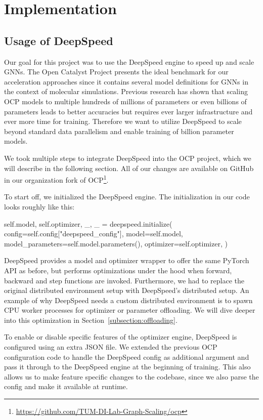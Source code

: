 \section{Implementation}
\label{section:implementation}

\subsection{Usage of DeepSpeed}

Our goal for this project was to use the DeepSpeed engine to speed up and scale 
GNNs. The Open Catalyst Project presents the ideal 
benchmark for our acceleration approaches since it contains several model definitions 
for GNNs in the context of molecular simulations. Previous research has shown 
that scaling OCP models to multiple hundreds of millions of parameters or even 
billions of parameters leads to better accuracies but requires ever larger infrastructure
and ever more time for training. Therefore we want to utilize 
DeepSpeed to scale beyond standard data parallelism and enable training of billion 
parameter models.

We took multiple steps to integrate DeepSpeed into the OCP project, which we will 
describe in the following section. All of our changes are available on GitHub in our 
organization fork of OCP\footnote{\url{https://github.com/TUM-DI-Lab-Graph-Scaling/ocp}}.

To start off, we initialized the DeepSpeed engine. 
The initialization in our code looks roughly like this:

\begin{python}
self.model, self.optimizer, _, _ = deepspeed.initialize(
    config=self.config["deepspeed_config"],
    model=self.model,
    model_parameters=self.model.parameters(),
    optimizer=self.optimizer,
)
\end{python}

DeepSpeed provides a model and optimizer wrapper to offer the same PyTorch API as 
before, but performs optimizations under the hood when forward, backward and step 
functions are invoked. Furthermore, we had to replace the original distributed 
environment setup with DeepSpeed's distributed setup. An example of why DeepSpeed 
needs a custom distributed environment is to spawn CPU worker processes for optimizer 
or parameter offloading. We 
will dive deeper into this optimization in Section~\ref{subsection:offloading}.

To enable or disable specific features of the optimizer engine, DeepSpeed is 
configured using an extra JSON file. We extended the previous OCP configuration 
code to handle the DeepSpeed config as additional argument and pass it through 
to the DeepSpeed engine at the beginning of training. This also allows us to 
make feature specific changes to the codebase, since we also parse the config and 
make it available at runtime.

